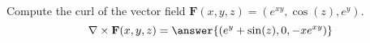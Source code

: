 \begin{problem}
Compute the curl of the vector field $\mathbf{F}(x,y,z) = (e^{xy},\cos(z),e^{y})$.
\[
\nabla\times\mathbf{F}(x,y,z) = \answer{(e^y+\sin(z),0,-xe^{xy})}
\]
\end{problem}
